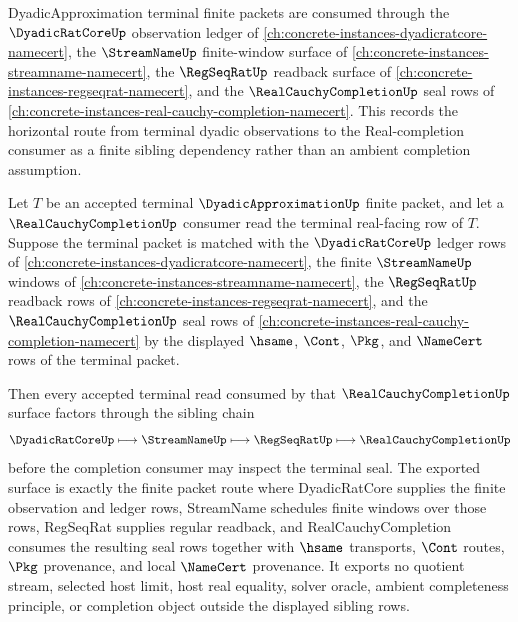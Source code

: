 DyadicApproximation terminal finite packets are consumed through the $\DyadicRatCoreUp$ observation ledger of \autoref{ch:concrete-instances-dyadicratcore-namecert}, the $\StreamNameUp$ finite-window surface of \autoref{ch:concrete-instances-streamname-namecert}, the $\RegSeqRatUp$ readback surface of \autoref{ch:concrete-instances-regseqrat-namecert}, and the $\RealCauchyCompletionUp$ seal rows of \autoref{ch:concrete-instances-real-cauchy-completion-namecert}. This records the horizontal route from terminal dyadic observations to the Real-completion consumer as a finite sibling dependency rather than an ambient completion assumption.

\begin{theorem}
\label{thm:dyadic-approximation-l10-real-completion-sibling-route}
Let $T$ be an accepted terminal $\DyadicApproximationUp$ finite packet, and let a $\RealCauchyCompletionUp$ consumer read the terminal real-facing row of $T$. Suppose the terminal packet is matched with the $\DyadicRatCoreUp$ ledger rows of \autoref{ch:concrete-instances-dyadicratcore-namecert}, the finite $\StreamNameUp$ windows of \autoref{ch:concrete-instances-streamname-namecert}, the $\RegSeqRatUp$ readback rows of \autoref{ch:concrete-instances-regseqrat-namecert}, and the $\RealCauchyCompletionUp$ seal rows of \autoref{ch:concrete-instances-real-cauchy-completion-namecert} by the displayed $\hsame$, $\Cont$, $\Pkg$, and $\NameCert$ rows of the terminal packet.

Then every accepted terminal read consumed by that $\RealCauchyCompletionUp$ surface factors through the sibling chain
$$
\DyadicRatCoreUp \longmapsto \StreamNameUp \longmapsto \RegSeqRatUp \longmapsto \RealCauchyCompletionUp
$$
before the completion consumer may inspect the terminal seal. The exported surface is exactly the finite packet route where DyadicRatCore supplies the finite observation and ledger rows, StreamName schedules finite windows over those rows, RegSeqRat supplies regular readback, and RealCauchyCompletion consumes the resulting seal rows together with $\hsame$ transports, $\Cont$ routes, $\Pkg$ provenance, and local $\NameCert$ provenance. It exports no quotient stream, selected host limit, host real equality, solver oracle, ambient completeness principle, or completion object outside the displayed sibling rows.
\end{theorem}
